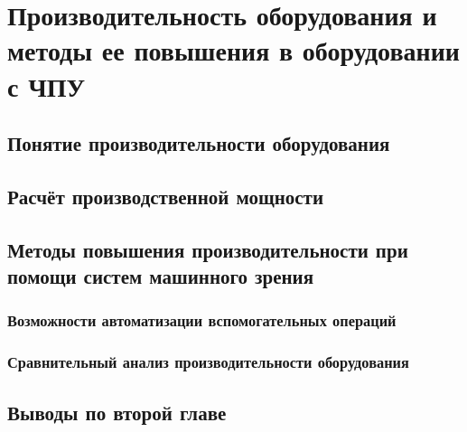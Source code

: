 \chapter{Производительность оборудования и методы ее повышения в оборудовании с ЧПУ} \label{chapt2}

\section{Понятие производительности оборудования} \label{sect2_1}

\section{Расчёт производственной мощности} \label{sect2_2}

\section{Методы повышения производительности при помощи систем машинного зрения} \label{sect2_3}

\subsection{Возможности автоматизации вспомогательных операций} \label{ssect2_3_1}

\subsection{Сравнительный анализ производительности оборудования} \label{ssect2_3_2}

\section{Выводы по второй главе} \label{sect2_4}

